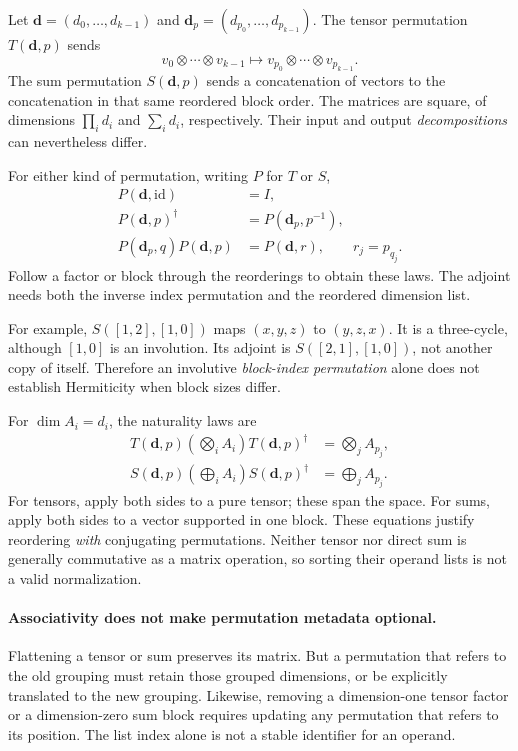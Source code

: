 \documentclass[11pt,a4paper]{article}
\newcommand{\ds}{\boldsymbol d}
\begin{document}
Let $\ds=(d_0,\ldots,d_{k-1})$ and
$\ds_p=(d_{p_0},\ldots,d_{p_{k-1}})$.
The tensor permutation $T(\ds,p)$ sends
\[
 v_0\otimes\cdots\otimes v_{k-1}
 \longmapsto v_{p_0}\otimes\cdots\otimes v_{p_{k-1}}.
\]
The sum permutation $S(\ds,p)$ sends a concatenation of vectors to
the concatenation in that same reordered block order. The matrices are
square, of dimensions $\prod_i d_i$ and $\sum_i d_i$, respectively.
Their input and output \emph{decompositions} can nevertheless differ.

For either kind of permutation, writing $P$ for $T$ or $S$,
\begin{align}
 P(\ds,\mathrm{id})&=I, \label{eq:perm-id}\\
 P(\ds,p)^\dagger&=P(\ds_p,p^{-1}), \label{eq:perm-adjoint}\\
 P(\ds_p,q)P(\ds,p)&=P(\ds,r),
       \qquad r_j=p_{q_j}. \label{eq:perm-compose}
\end{align}
Follow a factor or block through the reorderings to obtain these laws.
The adjoint needs both the inverse index permutation and the reordered
dimension list.

For example, $S([1,2],[1,0])$ maps $(x,y,z)$ to $(y,z,x)$.
It is a three-cycle, although $[1,0]$ is an involution. Its adjoint is
$S([2,1],[1,0])$, not another copy of itself.
Therefore an involutive \emph{block-index permutation} alone does not
establish Hermiticity when block sizes differ.

For $\dim A_i=d_i$, the naturality laws are
\begin{align}
 T(\ds,p)\left(\bigotimes_i A_i\right)T(\ds,p)^\dagger
    &=\bigotimes_j A_{p_j}, \label{eq:tensor-naturality}\\
 S(\ds,p)\left(\bigoplus_i A_i\right)S(\ds,p)^\dagger
    &=\bigoplus_j A_{p_j}. \label{eq:sum-naturality}
\end{align}
For tensors, apply both sides to a pure tensor; these span the space.
For sums, apply both sides to a vector supported in one block.
These equations justify reordering \emph{with} conjugating permutations.
Neither tensor nor direct sum is generally commutative as a matrix
operation, so sorting their operand lists is not a valid normalization.

\paragraph{Associativity does not make permutation metadata optional.}
Flattening a tensor or sum preserves its matrix. But a permutation that
refers to the old grouping must retain those grouped dimensions, or
be explicitly translated to the new grouping. Likewise, removing a
dimension-one tensor factor or a dimension-zero sum block requires
updating any permutation that refers to its position. The list index
alone is not a stable identifier for an operand.
\end{document}
